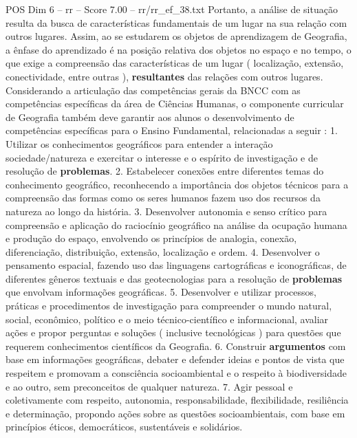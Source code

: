 \begin{textsample}{POS Dim 6 – rr – Score 7.00 – rr/rr\_ef\_38.txt}
Portanto, a análise de situação resulta da busca de características fundamentais de um lugar na sua relação com outros lugares.
Assim, ao se estudarem os objetos de aprendizagem de Geografia, a ênfase do aprendizado é na posição relativa dos objetos no espaço e no tempo, o que exige a compreensão das características de um lugar ( localização, extensão, conectividade, entre outras ), \textbf{resultantes} das relações com outros lugares.
Considerando a articulação das competências gerais da BNCC com as competências específicas da área de Ciências Humanas, o componente curricular de Geografia também deve garantir aos alunos o desenvolvimento de competências específicas para o Ensino Fundamental, relacionadas a seguir : 1.
Utilizar os conhecimentos geográficos para entender a interação sociedade/natureza e exercitar o interesse e o espírito de investigação e de resolução de \textbf{problemas}. 2.
Estabelecer conexões entre diferentes temas do conhecimento geográfico, reconhecendo a importância dos objetos técnicos para a compreensão das formas como os seres humanos fazem uso dos recursos da natureza ao longo da história. 3.
Desenvolver autonomia e senso crítico para compreensão e aplicação do raciocínio geográfico na análise da ocupação humana e produção do espaço, envolvendo os princípios de analogia, conexão, diferenciação, distribuição, extensão, localização e ordem. 4.
Desenvolver o pensamento espacial, fazendo uso das linguagens cartográficas e iconográficas, de diferentes gêneros textuais e das geotecnologias para a resolução de \textbf{problemas} que envolvam informações geográficas. 5.
Desenvolver e utilizar processos, práticas e procedimentos de investigação para compreender o mundo natural, social, econômico, político e o meio técnico-científico e informacional, avaliar ações e propor perguntas e soluções ( inclusive tecnológicas ) para questões que requerem conhecimentos científicos da Geografia. 6.
Construir \textbf{argumentos} com base em informações geográficas, debater e defender ideias e pontos de vista que respeitem e promovam a consciência socioambiental e o respeito à biodiversidade e ao outro, sem preconceitos de qualquer natureza. 7.
Agir pessoal e coletivamente com respeito, autonomia, responsabilidade, flexibilidade, resiliência e determinação, propondo ações sobre as questões socioambientais, com base em princípios éticos, democráticos, sustentáveis e solidários.

\end{textsample}
